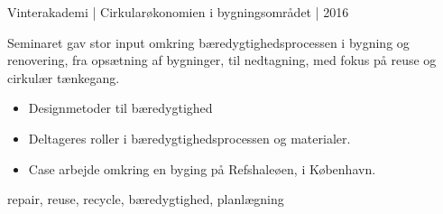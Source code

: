 \begin{projects}
\project
	{Vinterakademi | Cirkularøkonomien i bygningsområdet | 2016}{}
	{ \\
     }
	{ Seminaret gav stor input omkring bæredygtighedsprocessen i bygning og renovering, fra opsætning af bygninger, til nedtagning, med fokus på reuse og cirkulær tænkegang.
 \begin{itemize}
    	\item Designmetoder til bæredygtighed
        \item Deltageres roller i bæredygtighedsprocessen og materialer.
        \item Case arbejde omkring en byging på Refshaleøen, i København.
        \end{itemize}
        }
	{repair, reuse, recycle, bæredygtighed, planlægning}
\end{projects}